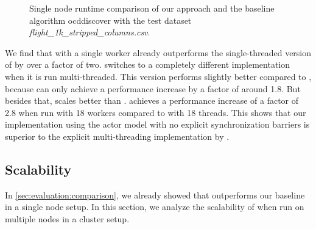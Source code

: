   \begin{figure}
    \centering
%    
    \caption{Single node runtime comparison of our approach and the baseline algorithm \gls{ocddiscover} with the test dataset \textit{flight\_1k\_stripped\_columns.csv}.}
    \label{fig:runtime-vs-ocddiscover}
  \end{figure}

  We find that \dodo{} with a single worker already outperforms the single-threaded version of \ocddiscover{} by over a factor of two.
  \ocddiscover{} switches to a completely different implementation when it is run multi-threaded.
  This version performs slightly better compared to \dodo{}, because \dodo{} can only achieve a performance increase by a factor of around 1.8.
  But besides that, \dodo{} scales better than \ocddiscover{}.
  \dodo{} achieves a performance increase of a factor of 2.8 when run with 18 workers compared to \ocddiscover{} with 18 threads.
  This shows that our implementation using the actor model with no explicit synchronization barriers is superior to the explicit multi-threading implementation by \citeauthor{consonni}.

\subsection{Scalability}\label{sec:evaluation:scalability}

  In \cref{sec:evaluation:comparison}, we already showed that \dodo{} outperforms our baseline \ocddiscover{} in a single node setup.
  In this section, we analyze the scalability of \dodo{} when run on multiple nodes in a cluster setup.


